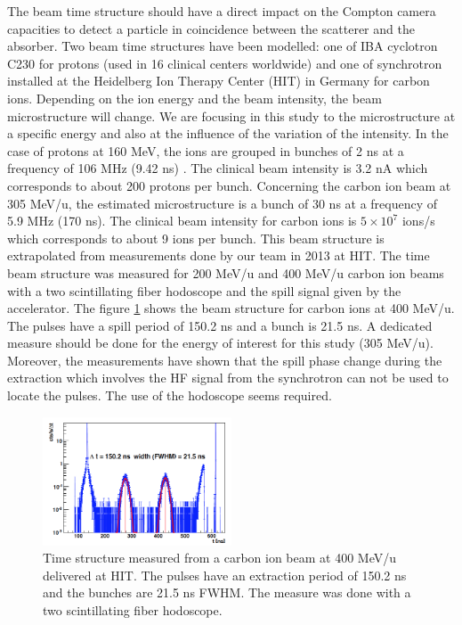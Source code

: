 \documentclass[12pt]{iopart}
\begin{document}
The beam time structure should have a direct impact on the Compton camera capacities to detect a particle in coincidence between the scatterer and the absorber.
Two beam time structures have been modelled: one of IBA cyclotron C230 for protons (used in 16 clinical centers worldwide) and one of synchrotron installed at the Heidelberg Ion Therapy Center (HIT) in Germany for carbon ions. Depending on the ion energy and the beam intensity, the beam microstructure will change. We are focusing in this study to the microstructure at a specific energy and also at the influence of the variation of the intensity. In the case of protons at 160 MeV, the ions are grouped in bunches of 2 ns at a frequency of 106 MHz (9.42 ns) \cite{f_roellinghoff_real-time_2014}. The clinical beam intensity is 3.2 nA which corresponds to about 200 protons per bunch. Concerning the carbon ion beam at 305 MeV/u, the estimated microstructure is a bunch of 30 ns at a frequency of 5.9 MHz (170 ns). The clinical beam intensity for carbon ions is $5\times10^7$ ions/s which corresponds to about 9 ions per bunch. This beam structure is extrapolated from measurements done by our team in 2013 at HIT. The time beam structure was measured for 200 MeV/u and 400 MeV/u carbon ion beams with a two scintillating fiber hodoscope and the spill signal given by the accelerator. The figure \ref{fig:fig_structure_temps_faisceau_HIT_2013_CC_simulation_Hadronth} shows the beam structure for carbon ions at 400 MeV/u. The pulses have a spill period of 150.2 ns and a bunch is 21.5 ns. A dedicated measure should be done for the energy of interest for this study (305 MeV/u).\newline
Moreover, the measurements have shown that the spill phase change during the extraction which involves  the HF signal from the synchrotron can not be used to locate the pulses. The use of the hodoscope seems required.\newline

	\begin{figure} [!hbtp]	
	\centering
	\includegraphics[width=0.5\textwidth]{./Figure/Material_Methods/2013_Structure_Time_Beam_400MeV.png}
	\caption{Time structure measured from a carbon ion beam at 400 MeV/u delivered at HIT. The pulses have an extraction period of 150.2 ns and the bunches are 21.5 ns FWHM. The measure was done with a two scintillating fiber hodoscope.}
	\label{fig:fig_structure_temps_faisceau_HIT_2013_CC_simulation_Hadronth}
	\end{figure}
\end{document}
